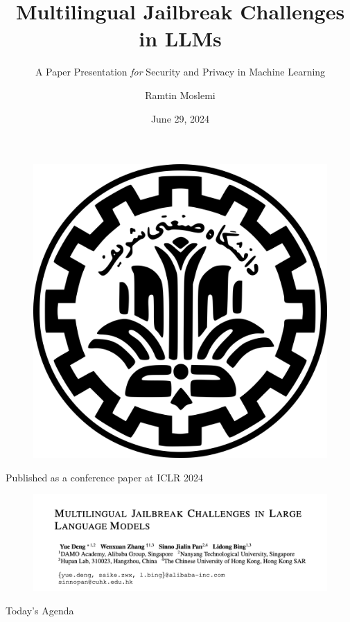 \documentclass[8pt]{beamer} %
\author{Ramtin Moslemi}
\title{Multilingual Jailbreak Challenges in LLMs}
\subtitle{A Paper Presentation \textit{for} Security and Privacy in Machine Learning}
\institute{Department of Computer Engineering, Sharif University of Technology}
\date{June 29, 2024}
\begin{document}
\begin{frame}
    \begin{figure}[htpb]
        \begin{center}
            \includegraphics[keepaspectratio, scale=0.025]{pic/sut-logo.png}
        \end{center}
    \end{figure}
    \titlepage
    \vspace*{-0.6cm}
\end{frame}

\begin{frame}{Published as a conference paper at ICLR 2024}
    \begin{figure}
        \centering
        \includegraphics[width=\linewidth]{pic/Title.png}
        \label{fig:title}
    \end{figure}
\end{frame}

\begin{frame}{Today's Agenda}
    \tableofcontents[sectionstyle=show,
    subsectionstyle=show/shaded/hide,
    subsubsectionstyle=show/shaded/hide]
\end{frame}












\end{document}
